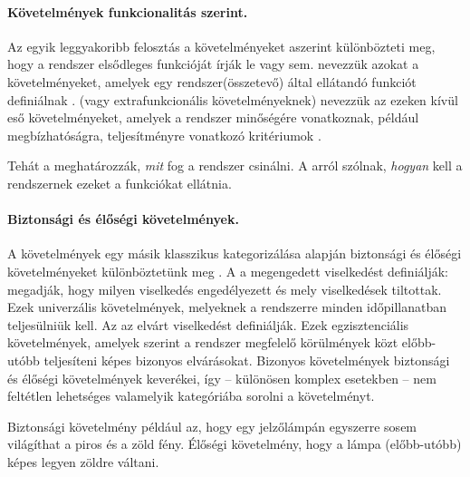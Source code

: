 \paragraph{Követelmények funkcionalitás szerint.}
Az egyik leggyakoribb felosztás a követelményeket aszerint különbözteti meg, hogy a rendszer elsődleges funkcióját írják le vagy sem.  nevezzük azokat a követelményeket, amelyek egy rendszer(összetevő) által ellátandó funkciót definiálnak \cite{IEEE-24765}.
 (vagy extrafunkcionális követelményeknek) nevezzük az ezeken kívül eső követelményeket, amelyek a rendszer minőségére vonatkoznak, például megbízhatóságra, teljesítményre vonatkozó kritériumok \cite{IEEE-24765}.

\begin{megjegyzes}
Tehát a  meghatározzák, \emph{mit} fog a rendszer csinálni. A  arról szólnak, \emph{hogyan} kell a rendszernek ezeket a funkciókat ellátnia.
\end{megjegyzes}

\paragraph{Biztonsági és élőségi követelmények.}
A követelmények egy másik klasszikus kategorizálása alapján biztonsági és élőségi követelményeket különböztetünk meg \cite{Lamport:1977}.
A  a megengedett viselkedést definiálják: megadják, hogy milyen viselkedés engedélyezett és mely viselkedések tiltottak. Ezek univerzális követelmények, melyeknek a rendszerre minden időpillanatban teljesülniük kell.
Az  az elvárt viselkedést definiálják.
Ezek egzisztenciális követelmények, amelyek szerint a rendszer megfelelő körülmények közt előbb-utóbb teljesíteni képes bizonyos elvárásokat.
Bizonyos követelmények biztonsági és élőségi követelmények keverékei, így -- különösen komplex esetekben -- nem feltétlen lehetséges valamelyik kategóriába sorolni a követelményt.

\begin{megjegyzes}
Biztonsági követelmény például az, hogy egy jelzőlámpán egyszerre sosem világíthat a piros és a zöld fény. Élőségi követelmény, hogy a lámpa (előbb-utóbb) képes legyen zöldre váltani.
\end{megjegyzes}



